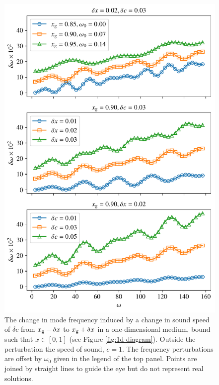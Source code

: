 \begin{figure}
    \centering
    \includegraphics{figures/glitch-1d-example-results.pdf}
    \caption[The change in mode frequency induced by a rapid change in sound speed for the 1D example.]{The change in mode frequency induced by a change in sound speed of \(\delta c\) from \(x_{{\mathrm{g}}} - \delta x\) to \(x_{{\mathrm{g}}} + \delta x\) in a one-dimensional medium, bound such that \(x \in [0, 1]\) (see Figure \ref{fig:1d-diagram}). Outside the perturbation the speed of sound, \(c=1\). The frequency perturbations are offset by \(\omega_0\) given in the legend of the top panel. Points are joined by straight lines to guide the eye but do not represent real solutions.
    }
    \label{fig:1d-results}
\end{figure}

